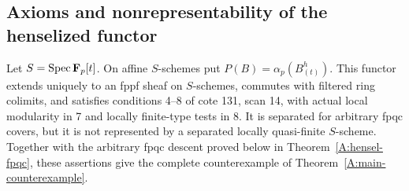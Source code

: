 \subsection{Axioms and nonrepresentability of the henselized functor}

\begin{proposition}\label{A:hensel-remaining-gate}
Let $S=\operatorname{Spec}\mathbf F_p[t]$. On affine $S$-schemes put
$P(B)=\alpha_p(B^h_{(t)})$. This functor extends uniquely to an
fppf sheaf on $S$-schemes, commutes with filtered ring colimits,
and satisfies conditions 4--8 of cote 131, scan 14, with actual
local modularity in 7 and locally finite-type tests in 8.
It is separated for arbitrary fpqc covers, but it is not represented
by a separated locally quasi-finite $S$-scheme.
Together with the arbitrary fpqc descent proved below in
Theorem~\ref{A:hensel-fpqc}, these assertions give the complete
counterexample of Theorem~\ref{A:main-counterexample}.
\end{proposition}

